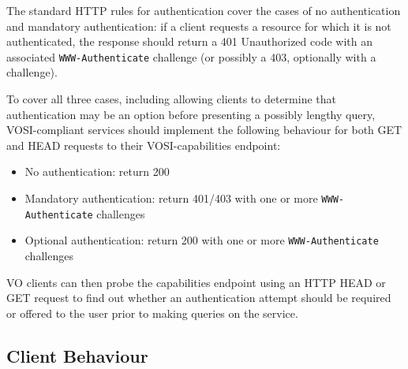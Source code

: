 \documentclass[11pt,a4paper]{ivoa}
\newcommand{\header}[1]{{\tt #1}}
\begin{document}
The standard HTTP rules for authentication cover the cases of
no authentication and mandatory authentication:
if a client requests a resource for which it is not authenticated,
the response should return a 401 Unauthorized code with an associated
\header{WWW-Authenticate} challenge
(or possibly a 403, optionally with a challenge).

To cover all three cases,
including allowing clients to determine that authentication may be an
option before presenting a possibly lengthy query,
VOSI-compliant services should implement the following behaviour
for both GET and HEAD requests to their VOSI-capabilities endpoint:
\begin{itemize}
  \item No authentication:
        return 200
  \item Mandatory authentication:
        return 401/403 with one or more \header{WWW-Authenticate} challenges
  \item Optional authentication:
        return 200 with one or more \header{WWW-Authenticate} challenges
\end{itemize}
VO clients can then probe the capabilities endpoint using an HTTP HEAD
or GET request to find out whether an authentication attempt should be
required or offered to the user prior to making queries on the service.

\subsection{Client Behaviour}
\end{document}
